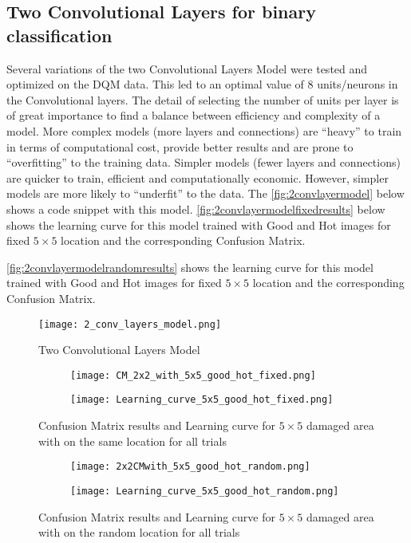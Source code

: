 \subsection{Two Convolutional Layers for binary classification}
Several variations of the two Convolutional Layers Model were tested and optimized on the DQM data. This led to an optimal value of 8 units/neurons in the Convolutional layers. 
The detail of selecting the number of units per layer is of great importance to find a balance between efficiency and complexity of a model. More complex models (more layers and connections) are “heavy” to train in terms of computational cost, provide better results and are prone to “overfitting” to the training data.
 Simpler models (fewer layers and connections) are quicker to train, efficient and computationally economic. However, simpler models are more likely to “underfit” to the data. The \autoref{fig:2convlayermodel} below shows a code snippet with this model.
\autoref{fig:2convlayermodelfixedresults} below shows the learning curve for this model trained with Good and Hot images for fixed $5\times 5$ location and the corresponding Confusion Matrix.

\autoref{fig:2convlayermodelrandomresults} shows the learning curve for this model trained with Good and Hot images for fixed $5\times5$  location and the corresponding Confusion Matrix.

\begin{figure}
\begin{center}
    \texttt{[image: 2\_conv\_layers\_model.png]}
\end{center}
\caption{Two Convolutional Layers Model\label{fig:2convlayermodel}}
\end{figure}


\begin{figure}
\centering
	\begin{subfigure}{.45\textwidth}
 	\texttt{[image: CM\_2x2\_with\_5x5\_good\_hot\_fixed.png]}
	\end{subfigure}
	\begin{subfigure}{.45\textwidth}
	\texttt{[image: Learning\_curve\_5x5\_good\_hot\_fixed.png]}
	\end{subfigure}
	\caption{Confusion Matrix results and Learning curve
	 for $5\times 5$ damaged area with on the same location for all trials\label{fig:2convlayermodelfixedresults}}
 \end{figure}
 
 \begin{figure}
 	\begin{subfigure}{.45\textwidth}
 		\texttt{[image: 2x2CMwith\_5x5\_good\_hot\_random.png]}
 	\end{subfigure}
 	\begin{subfigure}{.45\textwidth}
 	\texttt{[image: Learning\_curve\_5x5\_good\_hot\_random.png]}
 	\end{subfigure}
 \caption{Confusion Matrix results and Learning curve
	 for $5\times5$ damaged area with on the random location for all trials\label{fig:2convlayermodelrandomresults}}
 \end{figure}
 

